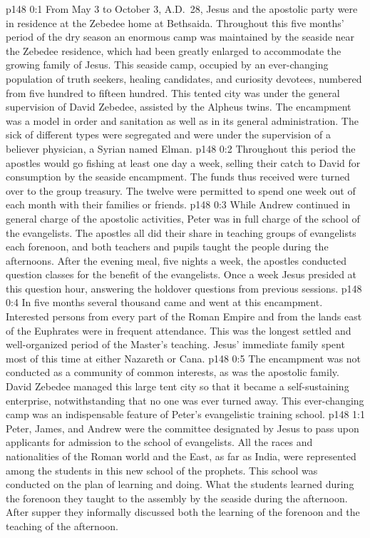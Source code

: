 \author{Midwayer Commission}
\vs p148 0:1 From May 3 to October 3, A.D.~28, Jesus and the apostolic party were in residence at the Zebedee home at Bethsaida. Throughout this five months’ period of the dry season an enormous camp was maintained by the seaside near the Zebedee residence, which had been greatly enlarged to accommodate the growing family of Jesus. This seaside camp, occupied by an ever\hyp{}changing population of truth seekers, healing candidates, and curiosity devotees, numbered from five hundred to fifteen hundred. This tented city was under the general supervision of David Zebedee, assisted by the Alpheus twins. The encampment was a model in order and sanitation as well as in its general administration. The sick of different types were segregated and were under the supervision of a believer physician, a Syrian named Elman.\plusone
\vs p148 0:2 Throughout this period the apostles would go fishing at least one day a week, selling their catch to David for consumption by the seaside encampment. The funds thus received were turned over to the group treasury. The twelve were permitted to spend one week out of each month with their families or friends.
\vs p148 0:3 While Andrew continued in general charge of the apostolic activities, Peter was in full charge of the school of the evangelists. The apostles all did their share in teaching groups of evangelists each forenoon, and both teachers and pupils taught the people during the afternoons. After the evening meal, five nights a week, the apostles conducted question classes for the benefit of the evangelists. Once a week Jesus presided at this question hour, answering the holdover questions from previous sessions.
\vs p148 0:4 In five months several thousand came and went at this encampment. Interested persons from every part of the Roman Empire and from the lands east of the Euphrates were in frequent attendance. This was the longest settled and well\hyp{}organized period of the Master’s teaching. Jesus’ immediate family spent most of this time at either Nazareth or Cana.
\vs p148 0:5 The encampment was not conducted as a community of common interests, as was the apostolic family. David Zebedee managed this large tent city so that it became a self\hyp{}sustaining enterprise, notwithstanding that no one was ever turned away. This ever\hyp{}changing camp was an indispensable feature of Peter’s evangelistic training school.
\vs p148 1:1 Peter, James, and Andrew were the committee designated by Jesus to pass upon applicants for admission to the school of evangelists. All the races and nationalities of the Roman world and the East, as far as India, were represented among the students in this new school of the prophets. This school was conducted on the plan of learning and doing. What the students learned during the forenoon they taught to the assembly by the seaside during the afternoon. After supper they informally discussed both the learning of the forenoon and the teaching of the afternoon.
